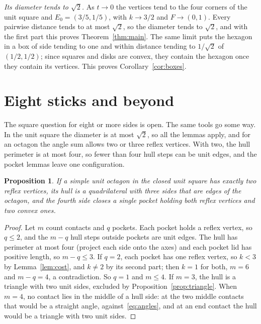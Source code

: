 \documentclass[11pt]{article}
\newtheorem{proposition}{Proposition}
\theoremstyle{remark}
\begin{document}
\emph{Its diameter tends to $\sqrt2$.} As $t\to0$ the vertices tend to the four corners of
the unit square and $E_0=(3/5,1/5)$, with $k\to3/2$ and $F\to(0,1)$. Every pairwise
distance tends to at most $\sqrt2$, so the diameter tends to $\sqrt2$, and with the first
part this proves Theorem~\ref{thm:main}. The same limit puts the hexagon in a box of side
tending to one and within distance tending to $1/\sqrt2$ of $(1/2,1/2)$; since squares and
disks are convex, they contain the hexagon once they contain its vertices. This proves
Corollary~\ref{cor:boxes}.

\section{Eight sticks and beyond}

The square question for eight or more sides is open. The same tools go some way. In the unit square the diameter is at most $\sqrt2$, so all the lemmas apply, and for an
octagon the angle sum allows two or three reflex vertices. With two, the
hull perimeter is at most four, so fewer than four hull steps can be unit edges, and the
pocket lemmas leave one configuration.

\begin{proposition}\label{prop:octagon}
If a simple unit octagon in the closed unit square has exactly two reflex vertices, its
hull is a quadrilateral with three sides that are edges of the octagon, and the fourth
side closes a single pocket holding both reflex vertices and two convex ones.
\end{proposition}

\begin{proof}
Let $m$ count contacts and $q$ pockets. Each pocket holds a reflex vertex, so $q\le2$, and
the $m-q$ hull steps outside pockets are unit edges. The hull has perimeter at most four
(project each side onto the axes) and each pocket lid has positive length, so $m-q\le3$.
If $q=2$, each pocket has one reflex vertex, so $k<3$ by Lemma~\ref{lem:cost}, and $k\ne2$
by its second part; then $k=1$ for both, $m=6$ and $m-q=4$, a contradiction. So $q=1$ and
$m\le4$. If $m=3$, the hull is a triangle with two unit sides, excluded by
Proposition~\ref{prop:triangle}. When $m=4$, no contact lies in the middle of a hull side:
at the two middle contacts that would be a straight angle, against~\eqref{eq:angles}, and
at an end contact the hull would be a triangle with two unit sides.
\end{proof}
\end{document}
